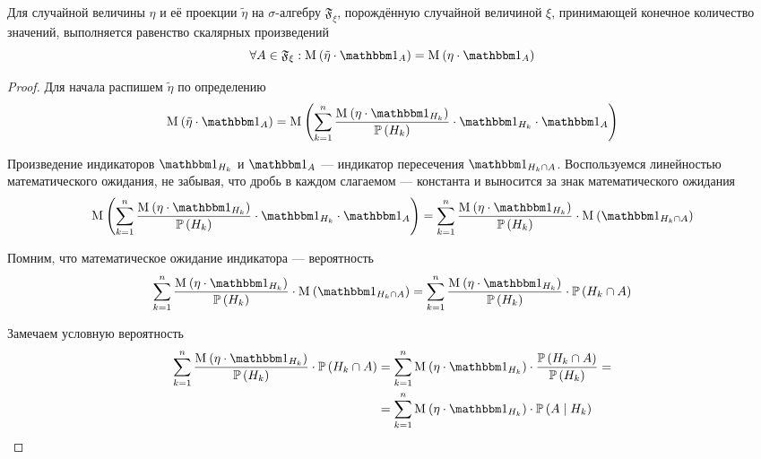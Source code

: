 \begin{lemma}
    Для случайной величины $\eta$ и её проекции $\tilde{\eta}$
    на $\sigma$-алгебру $\mathfrak{F}_\xi$,
    порождённую случайной величиной $\xi$,
    принимающей конечное количество значений,
    выполняется равенство скалярных произведений
    \begin{equation}\label{scalarMulEquality}
        \forall A \in \mathfrak{F}_\xi:
            \mean{\left( \tilde{\eta} \cdot \indicatorof{A} \right)}
                = \mean{\left( \eta \cdot \indicatorof{A} \right)}
    \end{equation}
\end{lemma}
\begin{proof}
Для начала распишем $\tilde{\eta}$ по определению
$$\mean{\left( \tilde{\eta} \cdot \indicatorof{A} \right)}
    = \mean{\left( \sum_{k=1}^n
        \frac{\mean{\left( \eta \cdot \indicatorof{H_k} \right)}}
            {\probability{H_k}}
        \cdot \indicatorof{H_k} \cdot \indicatorof{A} \right)}$$

Произведение индикаторов $\indicatorof{H_k}$ и $\indicatorof{A}$ --- индикатор
пересечения $\indicatorof{H_k \cap A}$.
Воспользуемся линейностью математического ожидания, не забывая,
что дробь в каждом слагаемом --- константа
и выносится за знак математического ожидания
$$\mean{\left( \sum_{k=1}^n
        \frac{\mean{\left( \eta \cdot \indicatorof{H_k} \right)}}
            {\probability{H_k}}
        \cdot \indicatorof{H_k} \cdot \indicatorof{A} \right)}
    = \sum_{k=1}^n
        \frac{\mean{\left( \eta \cdot \indicatorof{H_k} \right)}}
            {\probability{H_k}}
        \cdot \mean{\left( \indicatorof{H_k \cap A} \right)}$$

Помним, что математическое ожидание индикатора --- вероятность
$$\sum_{k=1}^n
    \frac{\mean{\left( \eta \cdot \indicatorof{H_k} \right)}}{\probability{H_k}}
        \cdot \mean{\left( \indicatorof{H_k \cap A} \right)}
    = \sum_{k=1}^n \frac{\mean{\left( \eta \cdot \indicatorof{H_k} \right)}}
        {\probability{H_k}}
        \cdot \probability{H_k \cap A}$$

Замечаем условную вероятность
\begin{align*}
    \sum_{k=1}^n \frac{\mean{\left( \eta \cdot \indicatorof{H_k} \right)}}
        {\probability{H_k}} \cdot \probability{H_k \cap A}
    &= \sum_{k=1}^n \mean{\left( \eta \cdot \indicatorof{H_k} \right)}
        \cdot \frac{\probability{H_k \cap A}}{\probability{H_k}} = \\
    &= \sum_{k=1}^n \mean{\left( \eta \cdot \indicatorof{H_k} \right)}
        \cdot \probability{A \mid H_k}
\end{align*}


\end{proof}

